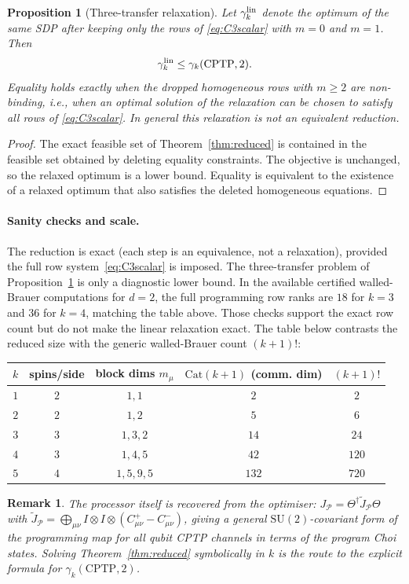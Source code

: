 \documentclass[11pt]{article}
\newtheorem{proposition}{Proposition}
\newtheorem{remark}{Remark}
\newcommand{\cP}{\mathcal{P}}
\newcommand{\SU}{\mathrm{SU}}
\newcommand{\CPTP}{\mathrm{CPTP}}
\newcommand{\ox}{\otimes}
\newcommand{\dg}{\dagger}
\begin{document}
\begin{proposition}[Three-transfer relaxation]\label{prop:linearrelax}
Let $\gamma_k^{\rm lin}$ denote the optimum of the same SDP after keeping only the
rows of \eqref{eq:C3scalar} with $m=0$ and $m=1$. Then
\begin{equation}
\gamma_k^{\rm lin}\le \gamma_k(\CPTP,2).
\end{equation}
Equality holds exactly when the dropped homogeneous rows with $m\ge2$ are non-binding,
i.e., when an optimal solution of the relaxation can be chosen to satisfy all rows of
\eqref{eq:C3scalar}. In general this relaxation is not an equivalent reduction.
\end{proposition}

\begin{proof}
The exact feasible set of Theorem~\ref{thm:reduced} is contained in the feasible set
obtained by deleting equality constraints. The objective is unchanged, so the relaxed
optimum is a lower bound. Equality is equivalent to the existence of a relaxed optimum
that also satisfies the deleted homogeneous equations.
\end{proof}

\paragraph{Sanity checks and scale.} The reduction is exact (each step is an equivalence,
not a relaxation), provided the full row system~\eqref{eq:C3scalar} is imposed. The
three-transfer problem of Proposition~\ref{prop:linearrelax} is only a diagnostic lower
bound. In the available certified walled-Brauer computations for $d=2$, the full
programming row ranks are $18$ for $k=3$ and $36$ for $k=4$, matching the table above.
Those checks support the exact row count but do not make the linear relaxation exact.
The table below contrasts the reduced size with the generic walled-Brauer count
$(k+1)!$:
\begin{center}
\begin{tabular}{c|cccc}
$k$ & spins/side & block dims $m_\mu$ & $\mathrm{Cat}(k+1)$ (comm. dim) & $(k+1)!$ \\ \hline
$1$ & $2$ & $1,1$ & $2$ & $2$\\
$2$ & $2$ & $1,2$ & $5$ & $6$\\
$3$ & $3$ & $1,3,2$ & $14$ & $24$\\
$4$ & $3$ & $1,4,5$ & $42$ & $120$\\
$5$ & $4$ & $1,5,9,5$ & $132$ & $720$\\
\end{tabular}
\end{center}

\begin{remark}
The processor itself is recovered from the optimiser: $J_\cP=\Theta^\dg\widetilde J_\cP\Theta$
with $\widetilde J_\cP=\bigoplus_{\mu\nu}I\ox I\ox(C^{+}_{\mu\nu}-C^{-}_{\mu\nu})$, giving a
general $\SU(2)$-covariant form of the programming map for all qubit CPTP channels in terms
of the program Choi states. Solving Theorem~\ref{thm:reduced} symbolically in $k$ is the
route to the explicit formula for $\gamma_k(\CPTP,2)$.
\end{remark}
\end{document}
